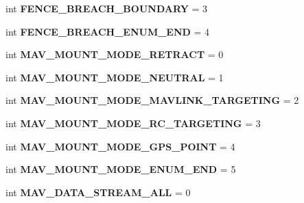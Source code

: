 \begin{DoxyCompactItemize}
int {\bfseries F\+E\+N\+C\+E\+\_\+\+B\+R\+E\+A\+C\+H\+\_\+\+B\+O\+U\+N\+D\+A\+RY} = 3
\item 
\mbox{\label{namespacepymavlink_1_1dialects_1_1v10_a8552c9348826961ac4ed36094d8472b9}} 
int {\bfseries F\+E\+N\+C\+E\+\_\+\+B\+R\+E\+A\+C\+H\+\_\+\+E\+N\+U\+M\+\_\+\+E\+ND} = 4
\item 
\mbox{\label{namespacepymavlink_1_1dialects_1_1v10_ae15a86e50b01e270cab41003b1d58671}} 
int {\bfseries M\+A\+V\+\_\+\+M\+O\+U\+N\+T\+\_\+\+M\+O\+D\+E\+\_\+\+R\+E\+T\+R\+A\+CT} = 0
\item 
\mbox{\label{namespacepymavlink_1_1dialects_1_1v10_a4ac28d15a812d4ffebd0db1db503f6e8}} 
int {\bfseries M\+A\+V\+\_\+\+M\+O\+U\+N\+T\+\_\+\+M\+O\+D\+E\+\_\+\+N\+E\+U\+T\+R\+AL} = 1
\item 
\mbox{\label{namespacepymavlink_1_1dialects_1_1v10_a23e67df5d9e7b1c99c42b885f06db09d}} 
int {\bfseries M\+A\+V\+\_\+\+M\+O\+U\+N\+T\+\_\+\+M\+O\+D\+E\+\_\+\+M\+A\+V\+L\+I\+N\+K\+\_\+\+T\+A\+R\+G\+E\+T\+I\+NG} = 2
\item 
\mbox{\label{namespacepymavlink_1_1dialects_1_1v10_a4492f2e033f0fe8c68a7ce0621148903}} 
int {\bfseries M\+A\+V\+\_\+\+M\+O\+U\+N\+T\+\_\+\+M\+O\+D\+E\+\_\+\+R\+C\+\_\+\+T\+A\+R\+G\+E\+T\+I\+NG} = 3
\item 
\mbox{\label{namespacepymavlink_1_1dialects_1_1v10_ae3db8e411a755b0ef225792175e4cd65}} 
int {\bfseries M\+A\+V\+\_\+\+M\+O\+U\+N\+T\+\_\+\+M\+O\+D\+E\+\_\+\+G\+P\+S\+\_\+\+P\+O\+I\+NT} = 4
\item 
\mbox{\label{namespacepymavlink_1_1dialects_1_1v10_a18a0929cc2d5335c4750da2a29f891c0}} 
int {\bfseries M\+A\+V\+\_\+\+M\+O\+U\+N\+T\+\_\+\+M\+O\+D\+E\+\_\+\+E\+N\+U\+M\+\_\+\+E\+ND} = 5
\item 
\mbox{\label{namespacepymavlink_1_1dialects_1_1v10_a664133c3e1442a6ff7d715b10daac40e}} 
int {\bfseries M\+A\+V\+\_\+\+D\+A\+T\+A\+\_\+\+S\+T\+R\+E\+A\+M\+\_\+\+A\+LL} = 0

\end{DoxyCompactItemize}
